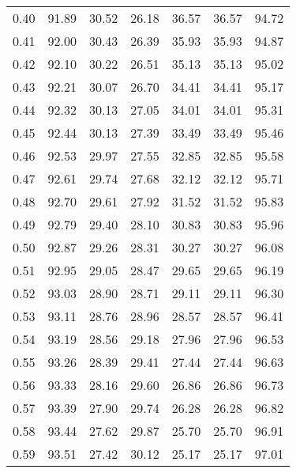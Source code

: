 \begin{tabular}{|c|c|c|c|c|c|c|}
      0.40 &     91.89 &     30.52 &      26.18 &   36.57 &      36.57 &         94.72 \\
      0.41 &     92.00 &     30.43 &      26.39 &   35.93 &      35.93 &         94.87 \\
      0.42 &     92.10 &     30.22 &      26.51 &   35.13 &      35.13 &         95.02 \\
      0.43 &     92.21 &     30.07 &      26.70 &   34.41 &      34.41 &         95.17 \\
      0.44 &     92.32 &     30.13 &      27.05 &   34.01 &      34.01 &         95.31 \\
      0.45 &     92.44 &     30.13 &      27.39 &   33.49 &      33.49 &         95.46 \\
      0.46 &     92.53 &     29.97 &      27.55 &   32.85 &      32.85 &         95.58 \\
      0.47 &     92.61 &     29.74 &      27.68 &   32.12 &      32.12 &         95.71 \\
      0.48 &     92.70 &     29.61 &      27.92 &   31.52 &      31.52 &         95.83 \\
      0.49 &     92.79 &     29.40 &      28.10 &   30.83 &      30.83 &         95.96 \\
      0.50 &     92.87 &     29.26 &      28.31 &   30.27 &      30.27 &         96.08 \\
      0.51 &     92.95 &     29.05 &      28.47 &   29.65 &      29.65 &         96.19 \\
      0.52 &     93.03 &     28.90 &      28.71 &   29.11 &      29.11 &         96.30 \\
      0.53 &     93.11 &     28.76 &      28.96 &   28.57 &      28.57 &         96.41 \\
      0.54 &     93.19 &     28.56 &      29.18 &   27.96 &      27.96 &         96.53 \\
      0.55 &     93.26 &     28.39 &      29.41 &   27.44 &      27.44 &         96.63 \\
      0.56 &     93.33 &     28.16 &      29.60 &   26.86 &      26.86 &         96.73 \\
      0.57 &     93.39 &     27.90 &      29.74 &   26.28 &      26.28 &         96.82 \\
      0.58 &     93.44 &     27.62 &      29.87 &   25.70 &      25.70 &         96.91 \\
      0.59 &     93.51 &     27.42 &      30.12 &   25.17 &      25.17 &         97.01 \\

\end{tabular}
